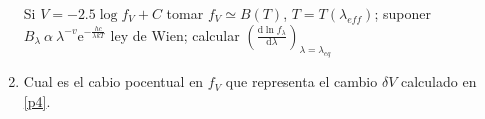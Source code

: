 \documentclass[10pt, spanish , a4paper, 1p]{elsarticle}
\begin{document}
\begin{enumerate}[wide, labelwidth=!, labelindent=0pt, label=\textbf{\textrm{\arabic*)}}, ref=\arabic*]
    Si $V = -2.5 \log f_V + C$ tomar $f_V \simeq B\left(T\right) $, $T=T\left({\lambda}_{eff}\right)$; suponer $B_{\lambda}\ \alpha\ {\lambda}^{-v} \mathrm{e}^{-\frac{hc}{\lambda k T}}$ ley de Wien; calcular $\left(\frac{\mathrm{d} \ln {f}_{\lambda}}{\mathrm{d}\lambda}\right)_{\lambda = {\lambda}_{eq}}$

    \item \label{p5} Cual es el cabio pocentual en $f_V$ que representa el cambio $\delta V$ calculado en \ref{p4}.


  \end{enumerate}
\end{document}
